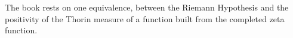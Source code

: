 \label{chap:foundations}

The book rests on one equivalence, between the Riemann Hypothesis and the positivity of the Thorin measure of a function built from the completed zeta function.
